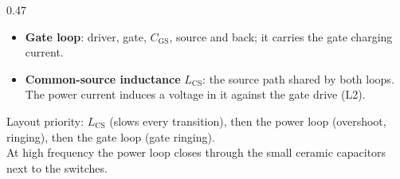 \begin{frame}
\begin{columns}[T]
\begin{column}{0.47\textwidth}
\begin{itemize}
				\item \textbf{Gate loop}: driver, gate, $C_\mathrm{GS}$, source and back; it carries the gate charging current.
				\item \textbf{Common-source inductance} $L_\mathrm{CS}$: the source path shared by both loops. The power current induces a voltage in it against the gate drive (L2).
			\end{itemize}
			Layout priority: $L_\mathrm{CS}$ (slows every transition), then the power loop (overshoot, ringing), then the gate loop (gate ringing).\\[0.4em]
			At high frequency the power loop closes through the small ceramic capacitors next to the switches.
		\end{column}
	\end{columns}
\end{frame}

